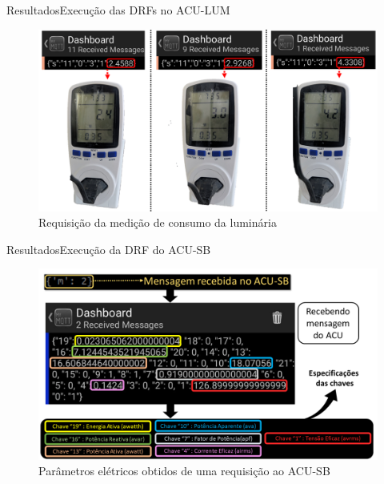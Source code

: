 \begin{frame}{Resultados}{Execução das DRFs no ACU-LUM}
\vspace{-0.6cm}
\begin{figure}[htp]
	\centering
	\caption{ \centering\small{{Requisição da medição de consumo da luminária}}}
	\includegraphics[width=1\linewidth]{img/apDRF3.png}
    \hspace{5cm}
    \vspace{1cm}
\end{figure}
\end{frame}

\begin{frame}{Resultados}{Execução da DRF do ACU-SB}
\vspace{-0.6cm}
\begin{figure}[htp]
	\centering
	\caption{ \centering\small{{Parâmetros elétricos obtidos de uma requisição ao ACU-SB}}}
	\includegraphics[width=0.97\linewidth]{img/msg_sb.png}
    \hspace{5cm}
    \vspace{1cm}
\end{figure}
\end{frame}